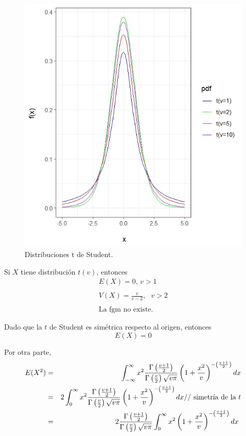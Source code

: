 \begin{i}
\begin{figure}[h!]
\centering
\includegraphics[scale=1]{Figuras/t_students.jpeg}
\caption{Distribuciones t de Student.}
\end{figure}

\begin{theorem}
Si $X$ tiene distribución $t(v)$, entonces
\begin{equation*}
\begin{array}{l}
E(X)=0\text{, \ }v>1 \\ 
\\ 
V(X)=\frac{v}{v-2},\text{ }v>2 \\ 
\\ 
\text{La fgm no existe.}
\end{array}
\end{equation*}
\end{theorem}


Dado que la $t$ de Student es simétrica respecto al origen, entonces
\begin{equation*}
E(X)=0
\end{equation*}


Por otra parte,
\begin{eqnarray*}
E(X^{2}) &=&\int_{-\infty }^{\infty }x^{2}\frac{\Gamma \left( \frac{v+1}{2}
\right) }{\Gamma \left( \frac{v}{2}\right) \sqrt{v\pi }}\left( 1+\frac{x^{2}
}{v}\right) ^{-\left( \frac{v+1}{2}\right) }dx \\
&=&2\int_{0}^{\infty }x^{2}\frac{\Gamma \left( \frac{v+1}{2}\right) }{\Gamma
\left( \frac{v}{2}\right) \sqrt{v\pi }}\left( 1+\frac{x^{2}}{v}\right)
^{-\left( \frac{v+1}{2}\right) }dx\text{// simetr\'{\i}a de la }t \\
&=&2\frac{\Gamma \left( \frac{v+1}{2}\right) }{\Gamma \left( \frac{v}{2}
\right) \sqrt{v\pi }}\int_{0}^{\infty }x^{2}\left( 1+\frac{x^{2}}{v}\right)
^{-\left( \frac{v+1}{2}\right) }dx\text{ }
\end{eqnarray*}



\end{i}
